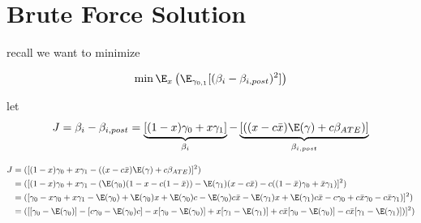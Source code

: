 






\section{Brute Force Solution}


recall we want to minimize

\begin{align*}
\min \E_x \left(\E_{\gamma_{0,1}}[(\beta_i - \beta_{i,post})^2]\right)
\end{align*}

let
\begin{align*}
	J = \beta_i -  \beta_{i,post} = \underbrace{[(1-x) \gamma_0 + x \gamma_1]}_{\text{$\beta_i$}}  - \underbrace{[((x - c \bar{x})\E(\gamma) + c \beta_{ATE})]}_\text{$\beta_{i,post}$}
\end{align*}


\begin{align*}
	J &= ([ (1-x) \gamma_0 + x \gamma_1  - ((x - c \bar{x})\E(\gamma) + c \beta_{ATE})]^2) \\
	  &= ([ (1-x) \gamma_0 + x \gamma_1  - (\E(\gamma_0)(1-x-c(1-\bar{x}))- \E(\gamma_1)(x - c\bar{x}) - c ((1-\bar{x}) \gamma_0 + \bar{x} \gamma_1 )]^2) \\
	  &= ([ \gamma_0 -x \gamma_0 + x \gamma_1  - \E(\gamma_0) +\E(\gamma_0)x + \E(\gamma_0)c-\E(\gamma_0)c \bar{x}- \E(\gamma_1)x + \E(\gamma_1)c\bar{x} - c \gamma_0 +c \bar{x} \gamma_0 - c \bar{x} \gamma_1 )]^2) \\
	  &= ([ [ \gamma_0- \E(\gamma_0) ] -[ c \gamma_0 - \E(\gamma_0)c ] -x [ \gamma_0-\E(\gamma_0) ] + x[ \gamma_1 - \E(\gamma_1) ]  +c \bar{x}[ \gamma_0 -\E(\gamma_0) ] - c \bar{x}[ \gamma_1 -\E(\gamma_1) ])]^2) \\
\end{align*} 

